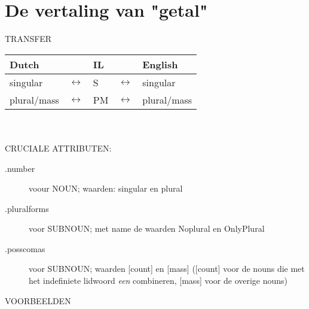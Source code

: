 
\pagestyle{empty}
\setlength{\parindent}{0in}
\setlength{\textheight}{57pc}
\setlength{\textwidth}{35pc}
\setlength{\topmargin}{-2pc}
\setlength{\oddsidemargin}{0.6cm}
\renewcommand{\baselinestretch}{1}

\section*{De vertaling van "getal"}

TRANSFER\\ 

\begin{tabular}{|lllll|} \hline
Dutch && IL & &  English \\ \hline\hline

singular & $\leftrightarrow$  & S  & $\leftrightarrow$ & singular \\ \hline
 
plural/mass & $\leftrightarrow$  &  PM  & $\leftrightarrow$  & plural/mass
 \\ \hline
\end{tabular}\\ \\

CRUCIALE ATTRIBUTEN:
\begin{description}
\item[.number] voour NOUN; waarden: singular en plural
\item[.pluralforms] voor SUBNOUN;  met name de waarden Noplural en OnlyPlural
\item[.posscomas] voor SUBNOUN; waarden [count] en [mass]
([count] voor de nouns die met het indefiniete
 lidwoord {\em een} combineren, [mass] voor de overige nouns)
\end{description}


VOORBEELDEN\\

